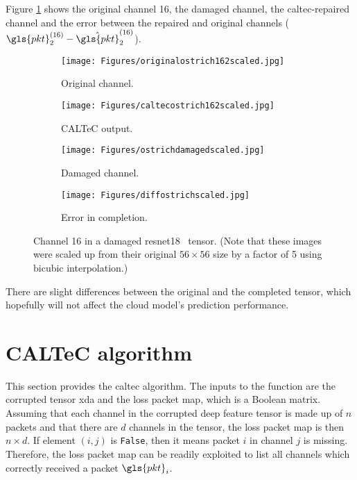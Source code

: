 Figure \ref{fig:caltec:ostrich} shows the original channel 16, the damaged channel, the \gls{caltec}-repaired channel and the error between the repaired and original channels ($\gls{pkt}_2^{(16)} -\hat{\gls{pkt}}_2^{(16)} $).


	\begin{figure}[H]
	\centering
	\begin{subfigure}{.44\textwidth}
		\centering
		\texttt{[image: Figures/originalostrich162scaled.jpg]}
		\caption{Original channel.}
	\end{subfigure}%
\hfill 
	\begin{subfigure}{.44\textwidth}
		\centering
		\texttt{[image: Figures/caltecostrich162scaled.jpg]}
		\caption{CALTeC output.}
	\end{subfigure}
\hfill
	\begin{subfigure}{.44\textwidth}
	\centering
	\texttt{[image: Figures/ostrichdamagedscaled.jpg]}
	\caption{Damaged channel.}
\end{subfigure}%
\hfill
	\begin{subfigure}{.44\textwidth}
	\centering
	\texttt{[image: Figures/diffostrichscaled.jpg]}
	\caption{Error in completion.}
\end{subfigure}%
	\caption[Channel 16 visualization in a damaged image ResNet18 tensor]{Channel 16 in a damaged \gls{resnet18} \addone~tensor. (Note that these images were scaled up from their original $56 \times 56$ size by a factor of 5 using bicubic interpolation.)}
	\label{fig:caltec:ostrich}
\end{figure}

There are slight differences between the original and the completed tensor, which hopefully will not affect the cloud model's prediction performance.

\section{CALTeC algorithm} \label{sec:caltec:algo}

This section provides the \gls{caltec} algorithm. The inputs to the function are the corrupted tensor \gls{xda} and the loss packet map, which is a Boolean matrix. Assuming that each channel in the corrupted deep feature tensor is made up of $n$ packets and that there are $d$ channels in the tensor, the loss packet map is then $n \times d$. If element $(i,j)$ is \verb|False|, then it means packet $i$ in channel $j$ is missing. Therefore, the loss packet map can be readily exploited to list all channels which correctly received a packet $\gls{pkt}_i$.

